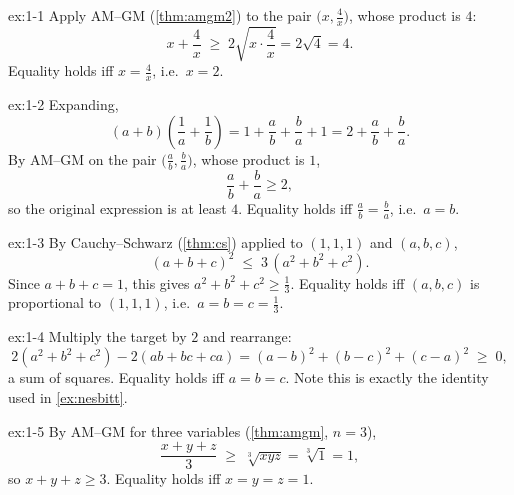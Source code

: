 
\begin{solution}{ex:1-1}
Apply AM--GM (\cref{thm:amgm2}) to the pair
$\big(x, \tfrac{4}{x}\big)$, whose product is $4$:
\[
  x + \frac{4}{x} \;\ge\; 2\sqrt{x \cdot \frac{4}{x}} = 2\sqrt4 = 4 .
\]
Equality holds iff $x = \tfrac{4}{x}$, i.e.\ $x = 2$.
\end{solution}

\begin{solution}{ex:1-2}
Expanding,
\[
  (a+b)\left(\frac1a + \frac1b\right)
  = 1 + \frac{a}{b} + \frac{b}{a} + 1
  = 2 + \frac{a}{b} + \frac{b}{a}.
\]
By AM--GM on the pair $\big(\tfrac{a}{b}, \tfrac{b}{a}\big)$, whose
product is $1$,
\[
  \frac{a}{b} + \frac{b}{a} \ge 2 ,
\]
so the original expression is at least $4$. Equality holds iff
$\tfrac{a}{b} = \tfrac{b}{a}$, i.e.\ $a = b$.
\end{solution}

\begin{solution}{ex:1-3}
By Cauchy--Schwarz (\cref{thm:cs}) applied to $(1,1,1)$ and
$(a,b,c)$,
\[
  (a+b+c)^2 \;\le\; 3\,(a^2+b^2+c^2).
\]
Since $a+b+c = 1$, this gives $a^2+b^2+c^2 \ge \tfrac13$. Equality
holds iff $(a,b,c)$ is proportional to $(1,1,1)$, i.e.\
$a=b=c=\tfrac13$.
\end{solution}

\begin{solution}{ex:1-4}
Multiply the target by $2$ and rearrange:
\[
  2(a^2+b^2+c^2) - 2(ab+bc+ca)
  = (a-b)^2 + (b-c)^2 + (c-a)^2 \;\ge\; 0,
\]
a sum of squares. Equality holds iff $a = b = c$. Note this is
exactly the identity used in \cref{ex:nesbitt}.
\end{solution}

\begin{solution}{ex:1-5}
By AM--GM for three variables (\cref{thm:amgm}, $n=3$),
\[
  \frac{x+y+z}{3} \;\ge\; \sqrt[3]{xyz} = \sqrt[3]{1} = 1,
\]
so $x+y+z \ge 3$. Equality holds iff $x=y=z=1$.
\end{solution}

